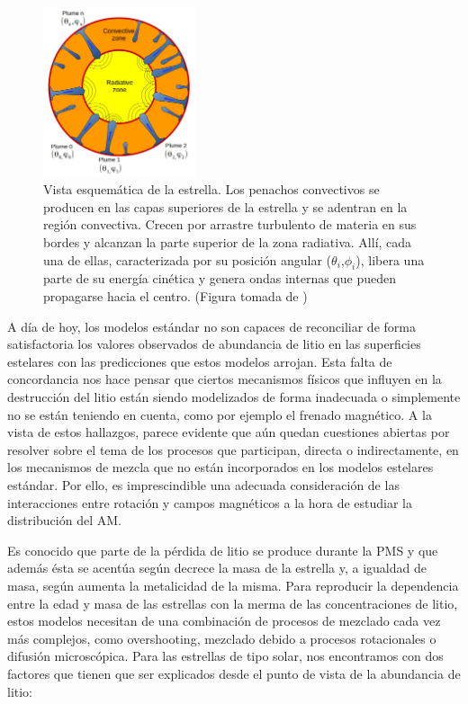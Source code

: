 \begin{figure}
    \centering
    \includegraphics[width=0.4\textwidth]{img/tesis/gravitational_waves.jpg}
    \caption{Vista esquemática de la estrella. Los penachos convectivos se producen en las capas superiores de la estrella y se adentran en la región convectiva. Crecen por arrastre turbulento de materia en sus bordes y alcanzan la parte superior de la zona radiativa. Allí, cada una de ellas, caracterizada por su posición angular ($\theta_i$,$\phi_i$), libera una parte de su energía cinética y genera ondas internas que pueden propagarse hacia el centro. (Figura tomada de \cite{Pincon2016})}
    \label{fig:grav_waves}
\end{figure}

A día de hoy, los modelos estándar no son capaces de reconciliar de forma satisfactoria los valores observados de abundancia de litio en las superficies estelares con las predicciones que estos modelos arrojan. Esta falta de concordancia nos hace pensar que ciertos mecanismos físicos que influyen en la destrucción del litio están siendo modelizados de forma inadecuada o simplemente no se están teniendo en cuenta, como por ejemplo el frenado magnético. A la vista de estos hallazgos, parece evidente que aún quedan cuestiones abiertas por resolver sobre el tema de los procesos que participan, directa o indirectamente, en los mecanismos de mezcla que no están incorporados en los modelos estelares estándar. Por ello, es imprescindible una adecuada consideración de las interacciones entre rotación y campos magnéticos a la hora de estudiar la distribución del AM. \par

Es conocido que parte de la pérdida de litio se produce durante la PMS y que además ésta se acentúa según decrece la masa de la estrella y, a igualdad de masa, según aumenta la metalicidad de la misma. Para reproducir la dependencia entre la edad y masa de las estrellas con la merma de las concentraciones de litio, estos modelos necesitan de una combinación de procesos de mezclado cada vez más complejos, como overshooting, mezclado debido a procesos rotacionales o difusión microscópica. Para las estrellas de tipo solar, nos encontramos con dos factores que tienen que ser explicados desde el punto de vista de la abundancia de litio:

